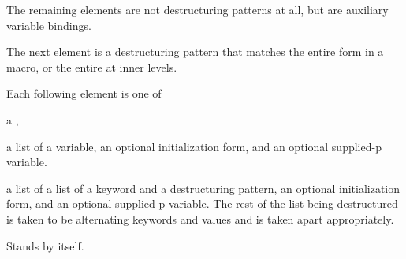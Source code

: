 
The remaining elements are not destructuring patterns at all, but are
auxiliary variable bindings.  
 

The next element is a destructuring pattern that matches the entire
form in a macro, or the entire  at inner levels.
 

Each following element is one of
\beginlist

\itemitem{}
 a ,

 a list of a variable,
           an optional initialization form,
       and an optional supplied-p variable.

 a list of a list of a keyword and a destructuring pattern,
           an optional initialization form,
       and an optional supplied-p variable.
\endlist
The rest of the list being destructured
is taken to be alternating keywords and values and is taken apart appropriately.
 

Stands by itself.
\endlist 
 
\endsubsubsubsection%





